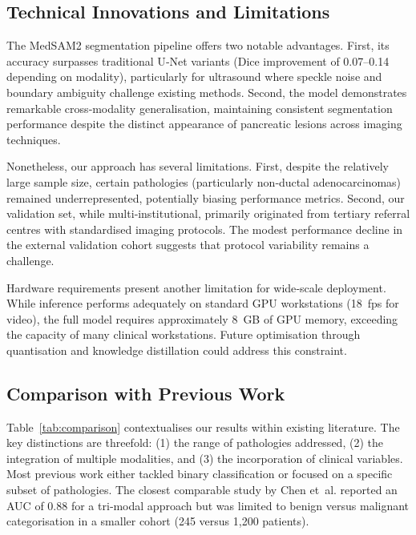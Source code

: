 \documentclass[a4paper, fleqn]{cas-dc}
\begin{document}
    \subsection{Technical Innovations and Limitations}
    The MedSAM2 segmentation pipeline offers two notable advantages. First, its
    accuracy surpasses traditional U‑Net variants (Dice improvement of 0.07–0.14
    depending on modality), particularly for ultrasound where speckle noise and boundary
    ambiguity challenge existing methods. Second, the model demonstrates remarkable
    cross‐modality generalisation, maintaining consistent segmentation
    performance despite the distinct appearance of pancreatic lesions across
    imaging techniques.

    Nonetheless, our approach has several limitations. First, despite the relatively
    large sample size, certain pathologies (particularly non‐ductal adenocarcinomas)
    remained underrepresented, potentially biasing performance metrics. Second, our
    validation set, while multi‐institutional, primarily originated from tertiary
    referral centres with standardised imaging protocols. The modest performance
    decline in the external validation cohort suggests that protocol variability
    remains a challenge.

    Hardware requirements present another limitation for wide‐scale deployment. While
    inference performs adequately on standard GPU workstations (18~fps for video),
    the full model requires approximately 8~GB of GPU memory, exceeding the capacity
    of many clinical workstations. Future optimisation through quantisation and
    knowledge distillation could address this constraint.

    \subsection{Comparison with Previous Work}
    Table~\ref{tab:comparison} contextualises our results within existing
    literature. The key distinctions are threefold: (1) the range of pathologies
    addressed, (2) the integration of multiple modalities, and (3) the
    incorporation of clinical variables. Most previous work either tackled binary
    classification\citep{Liu2020} or focused on a specific subset of pathologies\citep{Huang2022}.
    The closest comparable study by Chen et~al.\citep{Chen2023} reported an AUC of
    0.88 for a tri‐modal approach but was limited to benign versus malignant categorisation
    in a smaller cohort (245 versus 1,200 patients).
\end{document}
